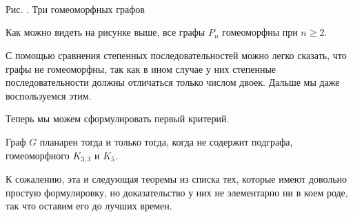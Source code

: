 \begin{center} \;\ \;\ \;\ \;\ \;\ \;\ \;\ \;\  \;\ \;\ \;\ \;\ \;\ \;\  \;\ \;\ \;\ \;\ \;\ \;\ 
\newline
\newline
	\small Рис. \images. Три гомеоморфных графов
\end{center}

	Как можно видеть на рисунке выше, все графы $P_n$ гомеоморфны при $n \geqslant 2$.
	
	С помощью сравнения степенных последовательностей можно легко сказать, что графы не гомеоморфны, 
	так как в ином случае у них степенные последовательности должны отличаться только числом двоек. Дальше мы даже воспользуемся этим.

	Теперь мы можем сформулировать первый критерий.
	
\begin{theorem}
	Граф $G$ планарен тогда и только тогда, когда не содержит подграфа, гомеоморфного $K_{3, 3}$ и $K_5$.
\end{theorem}

	К сожалению, эта и следующая теоремы из списка тех, которые имеют довольно простую формулировку, 
	но доказательство у них не элементарно ни в коем роде, так что оставим его до лучших времен.

